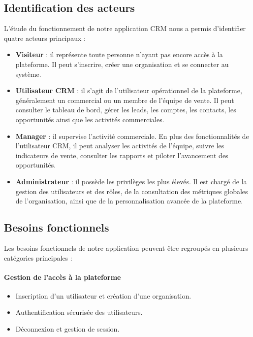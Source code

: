 \documentclass[12pt,a4paper,twoside,openany]{book}
\begin{document}
\subsection{Identification des acteurs}

L’étude du fonctionnement de notre application CRM nous a permis d’identifier quatre acteurs principaux :

\begin{itemize}
    \item \textbf{Visiteur} : il représente toute personne n’ayant pas encore accès à la plateforme. Il peut s’inscrire, créer une organisation et se connecter au système.
    
    \item \textbf{Utilisateur CRM} : il s’agit de l’utilisateur opérationnel de la plateforme, généralement un commercial ou un membre de l’équipe de vente. Il peut consulter le tableau de bord, gérer les leads, les comptes, les contacts, les opportunités ainsi que les activités commerciales.
    
    \item \textbf{Manager} : il supervise l’activité commerciale. En plus des fonctionnalités de l’utilisateur CRM, il peut analyser les activités de l’équipe, suivre les indicateurs de vente, consulter les rapports et piloter l’avancement des opportunités.
    
    \item \textbf{Administrateur} : il possède les privilèges les plus élevés. Il est chargé de la gestion des utilisateurs et des rôles, de la consultation des métriques globales de l’organisation, ainsi que de la personnalisation avancée de la plateforme.
\end{itemize}

\subsection{Besoins fonctionnels}

Les besoins fonctionnels de notre application peuvent être regroupés en plusieurs catégories principales :

\paragraph{Gestion de l’accès à la plateforme}
\begin{itemize}
    \item Inscription d’un utilisateur et création d’une organisation.
    \item Authentification sécurisée des utilisateurs.
    \item Déconnexion et gestion de session.
\end{itemize}
\end{document}
